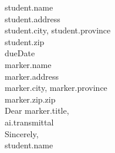 \documentclass[12pt]{letter}
\begin{document}
{{student.name}} \\
{{student.address}} \\
{{student.city}}, {{student.province}} \\
{{student.zip}} \\
\newline
{{dueDate}} \\
\newline
{{marker.name}} \\
{{marker.address}} \\
{{marker.city}}, {{marker.province}} \\
{{marker.zip.zip}} \\
\newline
Dear {{marker.title}}, \\
\newline
{{ai.transmittal}} \\
\newline
Sincerely, \\
\newline
{{student.name}}










\end{document}
